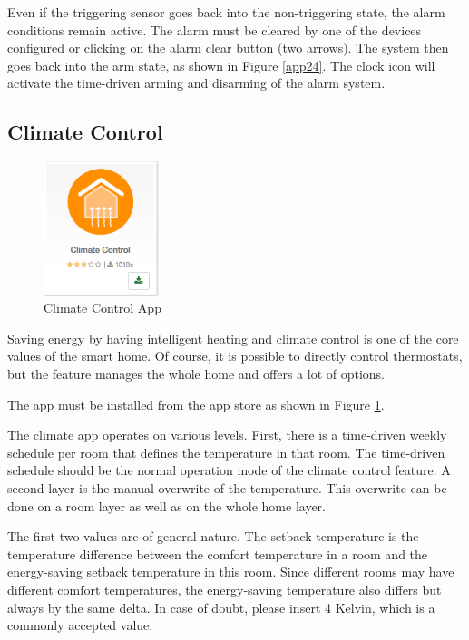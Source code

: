 Even if the triggering sensor goes back into the non-triggering state, the alarm conditions 
remain active. The alarm must be cleared by one of the devices configured or clicking on 
the alarm clear button (two arrows). The system then goes back into the arm state, as 
shown in Figure \ref{app24}. The clock icon will activate the time-driven arming and 
disarming of the alarm system.

\subsection{Climate Control}

\begin{figure}
\begin{center}
\includegraphics[width=0.3\textwidth]{pngs/cap6/app26.png}
\caption{Climate Control App}
\label{app26}
\end{center}
\end{figure}

Saving energy by having intelligent heating and climate control is one of the core values 
of the smart home. Of course, it is possible to directly control thermostats, but the 
 feature manages the whole home and offers a lot of options.

The app must be installed from the app store as shown in Figure \ref{app26}.

The climate app operates on various levels. First, there is a time-driven weekly schedule 
per room that defines the temperature in that room. The time-driven schedule should be the 
normal operation mode of the climate control feature. A second layer is the manual 
overwrite of the temperature. This overwrite can be done on a room layer as well as on the whole home layer.

The first two values are of general nature. The setback temperature is the temperature 
difference between the comfort temperature in a room and the energy-saving setback 
temperature in this room. Since different rooms may have different comfort temperatures, 
the energy-saving temperature also differs but always by the same delta. In case of doubt, 
please insert 4 Kelvin, which is a commonly accepted value.

